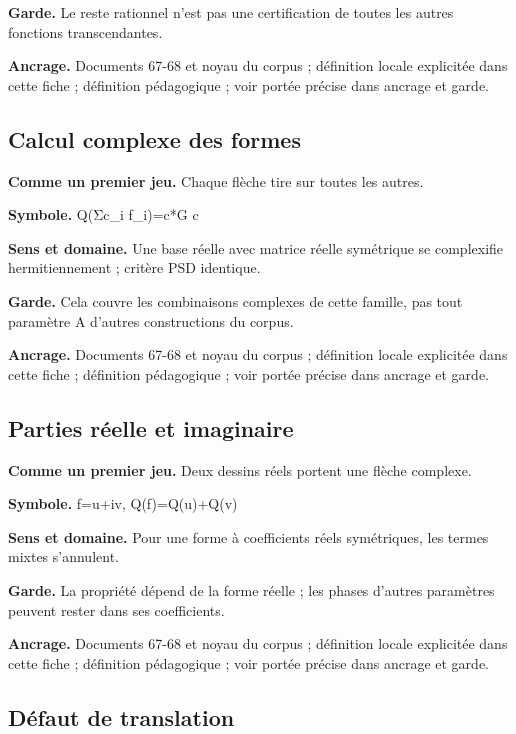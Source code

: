 \documentclass[
  9pt,
  a4paper,
]{article}
\begin{document}
\textbf{Garde.} Le reste rationnel n'est pas une certification de toutes
les autres fonctions transcendantes.

\textbf{Ancrage.} Documents 67-68 et noyau du corpus ; définition locale
explicitée dans cette fiche ; définition pédagogique ; voir portée
précise dans ancrage et garde.

\hypertarget{calcul-complexe-des-formes}{%
\subsection{Calcul complexe des
formes}\label{calcul-complexe-des-formes}}

\textbf{Comme un premier jeu.} Chaque flèche tire sur toutes les autres.

\textbf{Symbole.} Q(Σc\_i f\_i)=c*G c

\textbf{Sens et domaine.} Une base réelle avec matrice réelle symétrique
se complexifie hermitiennement ; critère PSD identique.

\textbf{Garde.} Cela couvre les combinaisons complexes de cette famille,
pas tout paramètre A d'autres constructions du corpus.

\textbf{Ancrage.} Documents 67-68 et noyau du corpus ; définition locale
explicitée dans cette fiche ; définition pédagogique ; voir portée
précise dans ancrage et garde.

\hypertarget{parties-ruxe9elle-et-imaginaire}{%
\subsection{Parties réelle et
imaginaire}\label{parties-ruxe9elle-et-imaginaire}}

\textbf{Comme un premier jeu.} Deux dessins réels portent une flèche
complexe.

\textbf{Symbole.} f=u+iv, Q(f)=Q(u)+Q(v)

\textbf{Sens et domaine.} Pour une forme à coefficients réels
symétriques, les termes mixtes s'annulent.

\textbf{Garde.} La propriété dépend de la forme réelle ; les phases
d'autres paramètres peuvent rester dans ses coefficients.

\textbf{Ancrage.} Documents 67-68 et noyau du corpus ; définition locale
explicitée dans cette fiche ; définition pédagogique ; voir portée
précise dans ancrage et garde.

\hypertarget{duxe9faut-de-translation}{%
\subsection{Défaut de translation}\label{duxe9faut-de-translation}}
\end{document}

